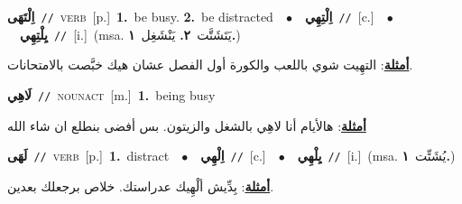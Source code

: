 \documentclass[10pt,a4paper,twoside]{article} %
\begin{document}
\begin{multicols}{2}
{\setlength\topsep{0pt}\textbf{\foreignlanguage{arabic}{اِلْتَهَى}}\ {\color{gray}\texttt{//}\color{black}}\ \textsc{verb}\ [p.]\ \textbf{1.}~be busy.  \textbf{2.}~be distracted\ \ $\bullet$\ \ \setlength\topsep{0pt}\textbf{\foreignlanguage{arabic}{اِلْتِهِي}}\ {\color{gray}\texttt{//}\color{black}}\ [c.]\ \ $\bullet$\ \ \setlength\topsep{0pt}\textbf{\foreignlanguage{arabic}{يِلْتِهِي}}\ {\color{gray}\texttt{//}\color{black}}\ [i.]\ \color{gray}(msa. \foreignlanguage{arabic}{يَتَشَتَّت}~\foreignlanguage{arabic}{\textbf{٢.}}  \foreignlanguage{arabic}{يَنْشَغِل}~\foreignlanguage{arabic}{\textbf{١.}})\color{black}\  \begin{flushright}\color{gray}\foreignlanguage{arabic}{\textbf{\underline{\foreignlanguage{arabic}{أمثلة}}}: التهِيت شوي باللعب والكورة أول الفصل عشان هيك خبَّصت بالامتحانات.}\end{flushright}\color{black}} \vspace{2mm}

{\setlength\topsep{0pt}\textbf{\foreignlanguage{arabic}{لَاهِي}}\ {\color{gray}\texttt{//}\color{black}}\ \textsc{noun\textunderscore act}\ [m.]\ \textbf{1.}~being busy\  \begin{flushright}\color{gray}\foreignlanguage{arabic}{\textbf{\underline{\foreignlanguage{arabic}{أمثلة}}}: هالأيام أنا لاهِي بالشغل والزيتون. بس أفضى بنطلع ان شاء الله}\end{flushright}\color{black}} \vspace{2mm}

{\setlength\topsep{0pt}\textbf{\foreignlanguage{arabic}{لَهَى}}\ {\color{gray}\texttt{//}\color{black}}\ \textsc{verb}\ [p.]\ \textbf{1.}~distract\ \ $\bullet$\ \ \setlength\topsep{0pt}\textbf{\foreignlanguage{arabic}{اِلْهِي}}\ {\color{gray}\texttt{//}\color{black}}\ [c.]\ \ $\bullet$\ \ \setlength\topsep{0pt}\textbf{\foreignlanguage{arabic}{يِلْهِي}}\ {\color{gray}\texttt{//}\color{black}}\ [i.]\ \color{gray}(msa. \foreignlanguage{arabic}{يُشَتِّت}~\foreignlanguage{arabic}{\textbf{١.}})\color{black}\  \begin{flushright}\color{gray}\foreignlanguage{arabic}{\textbf{\underline{\foreignlanguage{arabic}{أمثلة}}}: بِدِّيش ألْهِيك عدراستك. خلاص برجعلك بعدين.}\end{flushright}\color{black}} \vspace{2mm}


\end{multicols}
\end{document}
